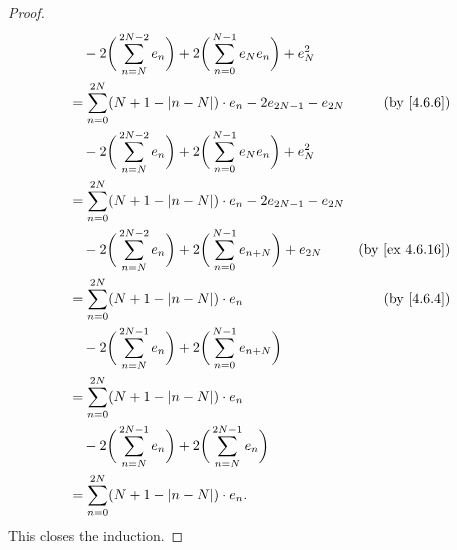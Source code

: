 \begin{proof}
\begin{align*}
     & \quad - 2 \bigg(\sum_{n = N}^{2N - 2} e_n\bigg) + 2 \bigg(\sum_{n = 0}^{N - 1} e_N e_n\bigg) + e_N^2                                             \\
     & = \sum_{n = 0}^{2N} (N + 1 - \abs{n - N}) \cdot e_n - 2 e_{2N - 1} - e_{2N}                                       & \text{(by \cref{4.6.6})}     \\
     & \quad - 2 \bigg(\sum_{n = N}^{2N - 2} e_n\bigg) + 2 \bigg(\sum_{n = 0}^{N - 1} e_N e_n\bigg) + e_N^2                                             \\
     & = \sum_{n = 0}^{2N} (N + 1 - \abs{n - N}) \cdot e_n - 2 e_{2N - 1} - e_{2N}                                                                      \\
     & \quad - 2 \bigg(\sum_{n = N}^{2N - 2} e_n\bigg) + 2 \bigg(\sum_{n = 0}^{N - 1} e_{n + N}\bigg) + e_{2N}           & \text{(by \cref{ex 4.6.16})} \\
     & = \sum_{n = 0}^{2N} (N + 1 - \abs{n - N}) \cdot e_n                                                               & \text{(by \cref{4.6.4})}     \\
     & \quad - 2 \bigg(\sum_{n = N}^{2N - 1} e_n\bigg) + 2 \bigg(\sum_{n = 0}^{N - 1} e_{n + N}\bigg)                                                   \\
     & = \sum_{n = 0}^{2N} (N + 1 - \abs{n - N}) \cdot e_n                                                                                              \\
     & \quad - 2 \bigg(\sum_{n = N}^{2N - 1} e_n\bigg) + 2 \bigg(\sum_{n = N}^{2N - 1} e_n\bigg)                                                        \\
     & = \sum_{n = 0}^{2N} (N + 1 - \abs{n - N}) \cdot e_n.
  \end{align*}
  This closes the induction.


\end{proof}
